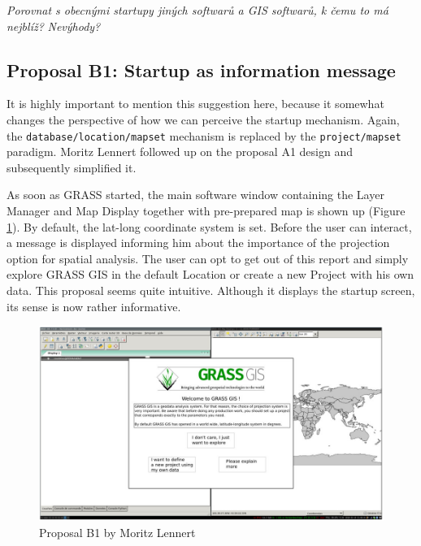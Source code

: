 \documentclass[a4paper,10pt,twoside]{article}
\begin{document}
\textit{\color{red} Porovnat s obecnými startupy jiných softwarů a GIS softwarů, k čemu to má nejblíž?}
\textit{\color{red} Nevýhody?}

\subsection{Proposal B1: Startup as information message}

It is highly important to mention this suggestion here, because it somewhat changes the perspective of how we can perceive the startup mechanism.  Again, the \texttt{database/location/mapset} mechanism is replaced by the \texttt{project/mapset} paradigm. Moritz Lennert followed up on the proposal A1 design and subsequently simplified it.

As soon as GRASS started, the main software window containing the Layer Manager and Map Display together with pre-prepared map is shown up (Figure \ref{fig:proposalB1}). By default, the lat-long coordinate system is set. Before the user can interact, a message is displayed informing him about the importance of the projection option for spatial analysis. The user can opt to get out of this report and simply explore GRASS GIS in the default Location or create a new Project with his own data. This proposal seems quite intuitive. Although it displays the startup screen, its sense is now rather informative.

\vspace{0.3cm}
\begin{figure}[hbt!] 
\begin{center}
\includegraphics[width=15cm]{../pictures/proposalB1.png} 
\caption[Proposal B1 by Moritz Lennert]{Proposal B1 by Moritz Lennert}
\label{fig:proposalB1}
\end{center}
\end{figure}
\end{document}
